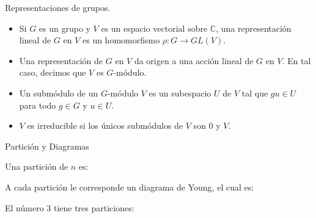 \documentclass[final,xcolor=svgnames]{beamer}
\begin{document}
\begin{frame}{}
\begin{columns}
\begin{column}{0.5\textwidth}
      \begin{block}{Representaciones de grupos.}
        \begin{itemize}
          \item Si $G$ es un grupo y $V$ es un espacio vectorial sobre
            $\mathbb{C}$, una \alert{representación lineal} de $G$ en
            $V$ es un homomorfismo $\rho\colon G\rightarrow GL(V).$
          \item Una representación de $G$ en $V$ da origen a una
            acción lineal de $G$ en $V$. En tal caso, decimos que $V$ es \alert{$G$-módulo.}  
         \item Un \alert{submódulo} de un $G$-módulo $V$ es un
           subespacio $U$ de $V$ tal que $gu \in U$ para todo $g\in G$ y $u\in U$.
          \item $V$ es \alert{irreducible} si los únicos submódulos de
            $V$ son $0$ y $V$.
        \end{itemize}
      \end{block}

      \begin{block}{Partición y Diagramas}
        \begin{minipage}{0.48\linewidth}
          Una \alert{partición} de $n$ es:

          A cada partición le corresponde un \alert{diagrama de
            Young}, el cual es:
          
          El número $3$ tiene tres particiones:


\end{minipage}
\end{block}
\end{column}
\end{columns}
\end{frame}
\end{document}
